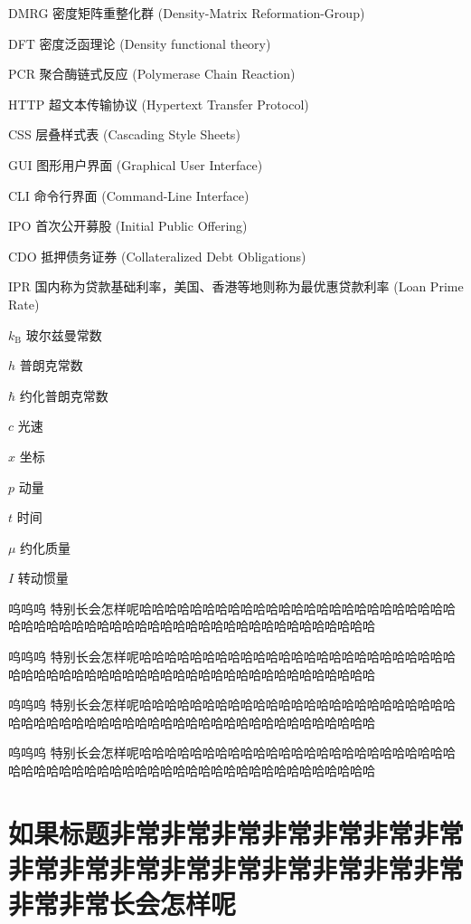 \documentclass{njuthesis}
\begin{document}
\begin{notation}[10cm]
  \item[DMRG] 密度矩阵重整化群 (Density-Matrix Reformation-Group)
  \item[DFT] 密度泛函理论 (Density functional theory)
  \item[PCR] 聚合酶链式反应 (Polymerase Chain Reaction)
  \item[HTTP] 超文本传输协议 (Hypertext Transfer Protocol)
  \item[CSS] 层叠样式表 (Cascading Style Sheets)
  \item[GUI] 图形用户界面 (Graphical User Interface)
  \item[CLI] 命令行界面 (Command-Line Interface)
  \item[IPO] 首次公开募股 (Initial Public Offering)
  \item[CDO] 抵押债务证券 (Collateralized Debt Obligations)
  \item[IPR] 国内称为贷款基础利率，美国、香港等地则称为最优惠贷款利率 (Loan Prime Rate)
  \item[$k_\mathrm{B}$] 玻尔兹曼常数
  \item[$h$] 普朗克常数
  \item[$\hbar$] 约化普朗克常数
  \item[$c$] 光速
  \item[$x$] 坐标
  \item[$p$] 动量
  \item[$t$] 时间
  \item[$\mu$] 约化质量
  \item[$I$] 转动惯量
  \item[呜呜呜] 特别长会怎样呢哈哈哈哈哈哈哈哈哈哈哈哈哈哈哈哈哈哈哈哈哈哈哈哈哈哈哈哈哈哈哈哈哈哈哈哈哈哈哈哈哈哈哈哈哈哈哈哈哈哈哈哈哈哈
  \item[呜呜呜] 特别长会怎样呢哈哈哈哈哈哈哈哈哈哈哈哈哈哈哈哈哈哈哈哈哈哈哈哈哈哈哈哈哈哈哈哈哈哈哈哈哈哈哈哈哈哈哈哈哈哈哈哈哈哈哈哈哈哈
  \item[呜呜呜] 特别长会怎样呢哈哈哈哈哈哈哈哈哈哈哈哈哈哈哈哈哈哈哈哈哈哈哈哈哈哈哈哈哈哈哈哈哈哈哈哈哈哈哈哈哈哈哈哈哈哈哈哈哈哈哈哈哈哈
  \item[呜呜呜] 特别长会怎样呢哈哈哈哈哈哈哈哈哈哈哈哈哈哈哈哈哈哈哈哈哈哈哈哈哈哈哈哈哈哈哈哈哈哈哈哈哈哈哈哈哈哈哈哈哈哈哈哈哈哈哈哈哈哈
\end{notation}

\chapter[非常长的标题不好看]{如果标题非常非常非常非常非常非常非常非常非常非常非常非常非常非常非常非常非常非常长会怎样呢}
\label{ch:longtitle}
\end{document}
